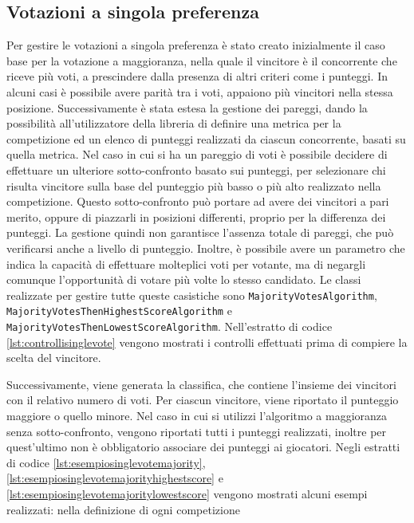 \documentclass[12pt,a4paper,openright,twoside]{book}
\begin{document}
\subsection{Votazioni a singola preferenza}
Per gestire le votazioni a singola preferenza è stato creato inizialmente il caso base per la votazione a maggioranza,
nella quale il vincitore è il concorrente che riceve più voti, a prescindere dalla presenza di altri criteri come i punteggi.
In alcuni casi è possibile avere parità tra i voti, appaiono più vincitori nella stessa posizione. 
Successivamente è stata estesa la gestione dei pareggi, dando la possibilità all'utilizzatore della libreria di definire 
una metrica per la competizione ed un elenco di punteggi realizzati da ciascun concorrente, basati su quella metrica.
Nel caso in cui si ha un pareggio di voti è possibile decidere di effettuare un ulteriore sotto-confronto basato sui punteggi,
per selezionare chi risulta vincitore sulla base del punteggio più basso o più alto realizzato nella competizione.
Questo sotto-confronto può portare ad avere dei vincitori a pari merito, oppure di piazzarli in posizioni differenti, proprio
per la differenza dei punteggi.
La gestione quindi non garantisce l'assenza totale di pareggi, che può verificarsi anche a livello di punteggio.
Inoltre, è possibile avere un parametro che indica la capacità di effettuare molteplici voti per votante, ma di negargli
comunque l'opportunità di votare più volte lo stesso candidato.
Le classi realizzate per gestire tutte queste casistiche sono \texttt{MajorityVotesAlgorithm}, \texttt{MajorityVotesThenHighestScoreAlgorithm}
e \texttt{MajorityVotesThenLowestScoreAlgorithm}. Nell'estratto di codice \ref{lst:controllisinglevote} vengono mostrati i controlli effettuati prima di 
compiere la scelta del vincitore.

Successivamente, viene generata la classifica, che contiene l'insieme dei vincitori con il relativo numero di voti. Per ciascun vincitore,
viene riportato il punteggio maggiore o quello minore. Nel caso in cui si utilizzi l'algoritmo a maggioranza senza sotto-confronto, vengono riportati
tutti i punteggi realizzati, inoltre per quest'ultimo non è obbligatorio associare dei punteggi ai giocatori.
Negli estratti di codice \ref{lst:esempiosinglevotemajority}, \ref{lst:esempiosinglevotemajorityhighestscore} e \ref{lst:esempiosinglevotemajoritylowestscore}  vengono mostrati alcuni esempi realizzati: nella definizione di ogni competizione
\end{document}
